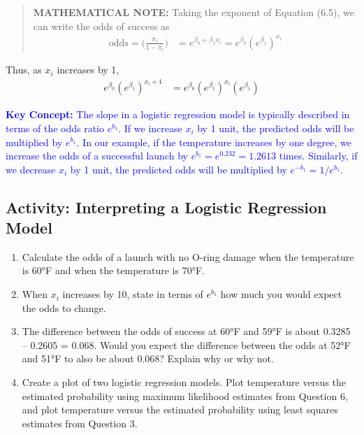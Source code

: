 \documentclass[
]{book}
\begin{document}
\begin{quote}
\textbf{MATHEMATICAL NOTE:}
Taking the exponent of Equation (6.5), we can write the odds of success as
\begin{align}
\text{odds} = \biggl(\frac{\pi_i}{1 - \pi_i}\biggr) &= e^{\beta_0 + \beta_1 x_i} = e^{\beta_0}(e^{\beta_1})^{x_i} \tag{6.11}
\end{align}
\end{quote}

Thus, as \(x_i\) increases by 1,
\begin{align}
e^{\beta_0}(e^{\beta_1})^{x_i + 1} &= e^{\beta_0}(e^{\beta_1})^{x_i}(e^{\beta_1}) \tag{6.12}
\end{align}

\textbf{\textcolor{blue}{Key Concept:}} \textcolor{blue}{The slope in a logistic regression model is typically described in terms of the odds ratio $e^{b_1}$. If we increase $x_i$ by 1 unit, the predicted odds will be multiplied by $e^{b_1}$. In our example, if the temperature increases by one degree, we increase the odds of a successful launch by $e^{b_1} = e^{0.232} = 1.2613$ times. Similarly, if we decrease $x_i$ by 1 unit, the predicted odds will be multiplied by $e^{-b_1} = 1/e^{b_1}$.}

\hypertarget{activity-interpreting-a-logistic-regression-model}{%
\subsection*{Activity: Interpreting a Logistic Regression Model}\label{activity-interpreting-a-logistic-regression-model}}

\begin{enumerate}
\def\labelenumi{\arabic{enumi}.}
\setcounter{enumi}{7}
\item
  Calculate the odds of a launch with no O-ring damage when the temperature is 60°F and when the temperature is 70°F.
\item
  When \(x_i\) increases by 10, state in terms of \(e^{b_1}\) how much you would expect the odds to change.\\
\item
  The difference between the odds of success at 60°F and 59°F is about 0.3285 -- 0.2605 = 0.068. Would you expect the difference between the odds at 52°F and 51°F to also be about 0.068? Explain why or why not.
\item
  Create a plot of two logistic regression models. Plot temperature versus the estimated probability using maximum likelihood estimates from Question 6, and plot temperature versus the estimated probability using least squares estimates from Question 3.
\end{enumerate}
\end{document}
